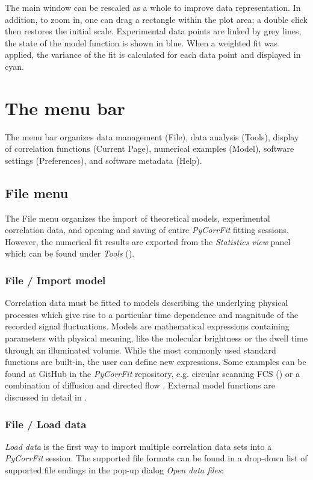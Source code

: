 The main window can be rescaled as a whole to improve data representation. In addition, to zoom in, one can drag a rectangle within the plot area; a double click then restores the initial scale. Experimental data points are linked by grey lines, the state of the model function is shown in blue. When a weighted fit was applied, the variance of the fit is calculated for each data point and displayed in cyan.

\section{The menu bar}
\label{sec:menub}
The menu bar organizes data management (File), data analysis (Tools), display of correlation functions (Current Page), numerical examples (Model), software settings (Preferences), and software metadata (Help).

\subsection{File menu}
\label{sec:menub.filem}
The File menu organizes the import of theoretical models, experimental correlation data, and opening and saving of entire \textit{PyCorrFit} fitting sessions. However, the numerical fit results are exported from the \textit{Statistics view} panel which can be found under \textit{Tools} ().

\subsubsection{File / Import model}
\label{sec:menub.filem.impor}
Correlation data must be fitted to models describing the underlying physical processes which give rise to a particular time dependence and magnitude of the recorded signal fluctuations. Models are mathematical expressions containing parameters with physical meaning, like the molecular brightness or the dwell time through an illuminated volume. While the most commonly used standard functions are built-in, the user can define new expressions.
Some examples can be found at GitHub in the \textit{PyCorrFit} repository, e.g. circular scanning FCS \cite{Petrasek2008} () or a combination of diffusion and directed flow \cite{Brinkmeier1999}. External model functions are discussed in detail in .


\subsubsection{File / Load data}
\label{sec:menub.filem.loadd}
\textit{Load data }is the first way to import multiple correlation data sets into a \textit{PyCorrFit} session. The supported file formats can be found in a drop-down list of supported file endings in the pop-up dialog \textit{Open data files}:


